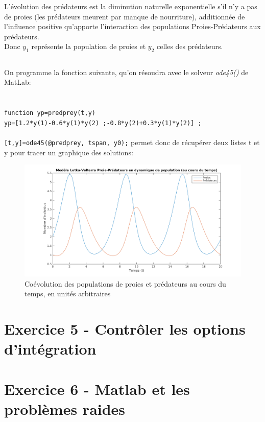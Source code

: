 \documentclass[a4paper,12pt,landscape]{article}
\begin{document}
L'évolution des prédateurs est la diminution naturelle exponentielle s'il n'y a pas de proies (les prédateurs meurent par manque de nourriture), additionnée de l'influence positive qu'apporte l'interaction des populations Proies-Prédateurs aux prédateurs.\\

Donc $y_1$ représente la population de proies et $y_2$ celles des prédateurs.

\subsection{}

On programme la fonction suivante, qu'on résoudra avec le solveur \textit{ode45()} de MatLab:\\
 \\
 \\ 
\texttt{function yp=predprey(t,y)\\
yp=[1.2*y(1)-0.6*y(1)*y(2) ;-0.8*y(2)+0.3*y(1)*y(2)] ;}\\
 \\
 
\texttt{[t,y]=ode45(@predprey, tspan, y0);} permet donc de récupérer deux listes t et y pour tracer un graphique des solutions:
\begin{figure}[h!]
	\centering
	\includegraphics[scale=0.7]{ex4_EDOpredpreybis.png}
	\caption{Coévolution des populations de proies et prédateurs au cours du temps, en unités arbitraires}
\end{figure}	

\section{Exercice 5 - Contrôler les options d'intégration}
\section{Exercice 6 - Matlab et les problèmes raides}
\end{document}
